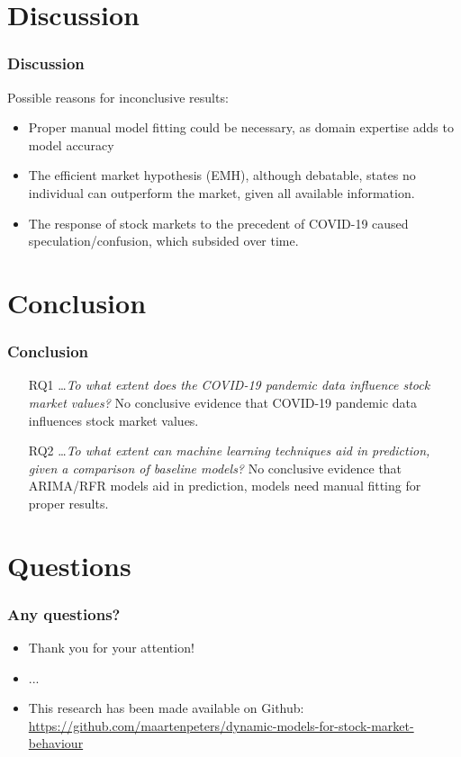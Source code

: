 \documentclass[aspectratio=169,classic]{uva-inf-presentation}
\begin{document}
\section{Discussion}
\begin{frame}
\frametitle{Discussion}
Possible reasons for inconclusive results:
\begin{itemize}
    \item Proper manual model fitting could be necessary, as domain expertise adds to model accuracy
    \item The efficient market hypothesis (EMH), although debatable, states no individual can outperform the market, given all available information.
    \item The response of stock markets to the precedent of COVID-19 caused speculation/confusion, which subsided over time.
\end{itemize}
\end{frame}



\section{Conclusion}
\begin{frame}
\frametitle{Conclusion}
\begin{itemize}
    \item[RQ1] \ldots \textit{To what extent does the COVID-19 pandemic data influence stock market values?} \newline
    No conclusive evidence that COVID-19 pandemic data influences stock market values.
    \item[RQ2] \ldots \textit{To what extent can machine learning techniques aid in prediction, given a comparison of baseline models?} \newline
    No conclusive evidence that ARIMA/RFR models aid in prediction, models need manual fitting for proper results.
\end{itemize}
\end{frame}



\section{Questions}
\begin{frame}
\frametitle{Any questions?}
\begin{itemize}
    \item Thank you for your attention!
    \item ...
    \item This research has been made available on Github: \small{\url{https://github.com/maartenpeters/dynamic-models-for-stock-market-behaviour}}
\end{itemize}
\end{frame}
\end{document}
